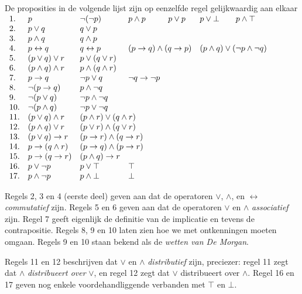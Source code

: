 \begin{theorem}
De proposities in de volgende lijst zijn op eenzelfde regel gelijkwaardig aan elkaar\\
$\begin{array}{*7l}
1. & p & \neg(\neg p) & p\land p\quad{} & p\lor p & p\lor\bot\quad{} & p\land\top \\
2. & p\lor q & q\lor p \\
3. & p\land q & q\land p\\
4. & p\leftrightarrow q & q\leftrightarrow p & \multicolumn{2}{l}{(p\rightarrow q)\land(q\rightarrow p)} & \multicolumn{2}{l}{(p\land q)\lor(\neg p \land\neg q)} \\
5. & (p\lor q)\lor r & p\lor(q\lor r) \\
6. & (p\land q)\land r & p\land(q\land r) \\
7. & p\rightarrow q & \neg p\lor q & \neg q \rightarrow\neg p \\
8. & \neg(p\rightarrow q) & p\land\neg q \\
9. & \neg(p\lor q) & \neg p\land\neg q \\
10. & \neg(p\land q) & \neg p \lor\neg q \\
11. & (p\lor q)\land r & \multicolumn{2}{l}{(p\land r)\lor(q\land r)} \\
12. & (p\land q)\lor r & \multicolumn{2}{l}{(p\lor r)\land(q\lor r)} \\
13. & (p\lor q)\rightarrow r & \multicolumn{2}{l}{(p\rightarrow r)\land(q\rightarrow r)} \\
14. & p\rightarrow(q\land r) & \multicolumn{2}{l}{(p\rightarrow q)\land (p\rightarrow r)} \\
15. & p\rightarrow(q\rightarrow r) & (p\land q)\rightarrow r \\
16. & p\lor\neg p & p\lor\top & \top \\
17. & p\land\neg p & p\land\bot & \bot 
\end{array}$\label{th:equiv}
\end{theorem}

Regels 2, 3 en 4 (eerste deel) geven aan dat de operatoren $\lor$, $\land$, en $\leftrightarrow$ \textit{commutatief} zijn. Regels 5 en 6 geven aan dat de operatoren $\lor$ en $\land$ \textit{associatief} zijn. Regel 7 geeft eigenlijk de definitie van de implicatie en tevens de contrapositie. Regels 8, 9 en 10 laten zien hoe we met ontkenningen moeten omgaan. Regels 9 en 10 staan bekend als de \textit{wetten van De Morgan}.

Regels 11 en 12 beschrijven dat $\lor$ en $\land$ \textit{distributief} zijn, preciezer: regel 11 zegt dat $\land$ \textit{distribueert over} $\lor$, en regel 12 zegt dat $\lor$ distribueert over $\land$. Regel 16 en 17 geven nog enkele voordehandliggende verbanden met $\top$ en $\bot$.

